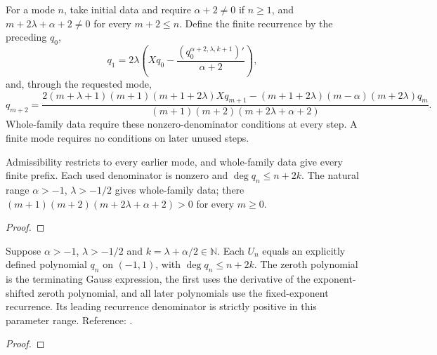\begin{supporting}
\begin{definition}
\label{def:power-law-recurrence}
\leanok
For a mode $n$, take initial data and require $\alpha+2\ne0$ if $n\ge1$,
and $m+2\lambda+\alpha+2\ne0$ for every $m+2\le n$.
Define the finite recurrence by the preceding $q_0$,
\[
 q_1=2\lambda\left(Xq_0-\frac{(q_0^{\alpha+2,\lambda,k+1})'}{\alpha+2}\right),
\]
and, through the requested mode,
\[
 q_{m+2}=\frac{2(m+\lambda+1)(m+1)(m+1+2\lambda)Xq_{m+1}
 -(m+1+2\lambda)(m-\alpha)(m+2\lambda)q_m}
 {(m+1)(m+2)(m+2\lambda+\alpha+2)}.
\]
Whole-family data require these nonzero-denominator conditions at every step.
A finite mode requires no conditions on later unused steps.
\end{definition}
\begin{theorem}
\label{thm:power-law-recurrence}
\leanok
Admissibility restricts to every earlier mode, and whole-family data give every
finite prefix. Each used denominator is nonzero and $\deg q_n\le n+2k$.
The natural range $\alpha>-1$, $\lambda>-1/2$ gives whole-family data;
there $(m+1)(m+2)(m+2\lambda+\alpha+2)>0$ for every $m\ge0$.
\end{theorem}
\begin{proof}
\leanok
\end{proof}
\end{supporting}


\begin{theorem}
\label{thm:power-law-compatible-polynomials}
\leanok
Suppose $\alpha>-1$, $\lambda>-1/2$ and $k=\lambda+\alpha/2\in\mathbb N$.
Each $U_n$ equals an explicitly defined polynomial $q_n$ on $(-1,1)$, with
$\deg q_n\le n+2k$. The zeroth polynomial is the terminating Gauss expression,
the first uses the derivative of the exponent-shifted zeroth polynomial,
and all later polynomials use the fixed-exponent recurrence. Its leading
recurrence denominator is strictly positive in this parameter range.
Reference: \cite[Lemma 2.7 and Theorem 2.4]{gutleb-carrillo-olver}.
\end{theorem}
\begin{proof}
\leanok
\end{proof}

